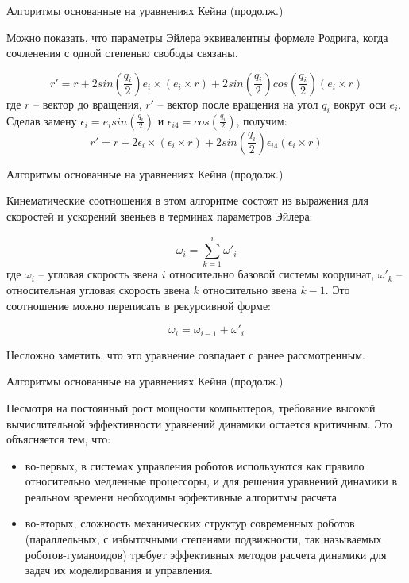 \documentclass[newPxFont,numfooter,sectionpages]{beamer}
\begin{document}
\begin{frame}{Алгоритмы основанные на уравнениях Кейна (продолж.)}

Можно показать, что параметры Эйлера эквивалентны формеле Родрига, когда сочленения с одной степенью свободы связаны. 

\begin{equation*}
r' = r + 2 sin (\frac{q_i}{2}) e_i \times (e_i \times r) + 2 sin (\frac{q_i}{2}) cos (\frac{q_i}{2}) (e_i \times r)
\end{equation*}
где $r$ -- вектор до вращения, $r'$ -- вектор после вращения на угол $q_i$ вокруг оси $e_i$. Сделав замену $\epsilon_i =e_i sin (\frac{q_i}{2}) $ и $\epsilon_{i4} = cos  (\frac{q_i}{2})$, получим:
\begin{equation*}
r' = r + 2 \epsilon_i \times (\epsilon_i \times r) + 2 sin (\frac{q_i}{2}) \epsilon_{i4} (\epsilon_i \times r)
\end{equation*}

\end{frame}

\begin{frame}{Алгоритмы основанные на уравнениях Кейна (продолж.)}
	
	Кинематические соотношения в этом алгоритме состоят из  выражения для скоростей и ускорений звеньев в терминах параметров Эйлера:
	
	\begin{equation*}
	\omega_i = \sum_{k=1}^{i} \omega'_i
	\end{equation*}
	где $\omega_i$ -- угловая скорость звена $i$ относительно базовой системы координат, $\omega'_k$ -- относительная угловая скорость звена $k$ относительно звена $k-1$. Это соотношение можно переписать в рекурсивной форме:
	
	\begin{equation*}
	\omega_i = \omega_{i-1} + \omega'_i
	\end{equation*}
	
	Несложно заметить, что это уравнение совпадает с ранее рассмотренным. 
\end{frame}

\begin{frame}{Алгоритмы основанные на уравнениях Кейна (продолж.)}
	
Несмотря на постоянный рост мощности компьютеров, требование высокой вычислительной эффективности уравнений динамики остается критичным. Это объясняется тем, что:
\begin{itemize}
\item во-первых, в системах управления роботов используются как правило относительно медленные процессоры, и для решения уравнений динамики в реальном времени необходимы эффективные алгоритмы расчета
\item во-вторых, сложность механических структур современных роботов (параллельных, с избыточными степенями подвижности, так называемых роботов-гуманоидов) требует эффективных методов расчета динамики для задач их моделирования и управления.
\end{itemize}
\end{frame}
\end{document}
